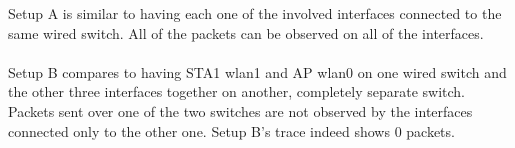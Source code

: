 Setup A is similar to having each one of the involved interfaces connected to the same wired switch. All of the packets can be observed on all of the interfaces. \\ \\
Setup B compares to having STA1 wlan1 and AP wlan0 on one wired switch and the other three interfaces together on another, completely separate switch. Packets sent over one of the two switches are not observed by the interfaces connected only to the other one. Setup B's trace indeed shows 0 packets.
